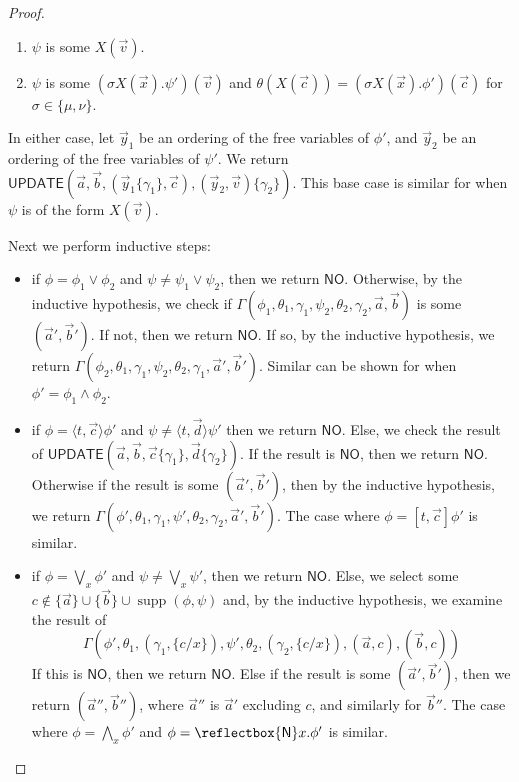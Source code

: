 \documentclass[10pt,a4paper]{article}
\theoremstyle{definition}
\theoremstyle{remark}
\newcommand\new[0]{\reflectbox{\ensuremath{\mathsf{N}}}}
\newcommand\fresh[1]{\new #1.}
\DeclareMathOperator{\supp}{supp}
\newcommand\diam[1]{\langle#1\rangle}
\newcommand\sq[1]{[#1]}
\newcommand\NO[0]{\mathsf{NO}}
\newcommand\update[0]{\mathsf{UPDATE}}
\begin{document}
\begin{proof}
\begin{itemize}
		\begin{enumerate}
			\item $\psi$ is some $X(\vec v)$.
						\item $\psi$ is some $(\sigma X(\vec x).\psi')(\vec v)$ and $\theta(X(\vec c)) = (\sigma X(\vec x).\phi')(\vec c)$ for $\sigma \in \{\mu, \nu\}$.
		\end{enumerate}
		In either case, 
		let $\vec y_1$ be an ordering of the free variables of $\phi'$, and $\vec y_2$ be an ordering of the free variables of $\psi'$. 
		We return $\update(\vec a, \vec b, (\vec y_1\{\gamma_1\}, \vec c), (\vec y_2, \vec v)\{\gamma_2\})$.
		This base case is similar for when $\psi$ is of the form $X(\vec v)$.
	\end{itemize}
	Next we perform inductive steps:
	\begin{itemize}
		\item if $\phi = \phi_1 \lor \phi_2$ and $\psi \neq \psi_1 \lor \psi_2$, then we return $\NO$. 
		Otherwise, by the inductive hypothesis, we check if $\Gamma(\phi_1, \theta_1, \gamma_1, \psi_2, \theta_2, \gamma_2, \vec a, \vec b)$ is some $(\vec a', \vec b')$. 
		If not, then we return $\NO$.
		If so, by the inductive hypothesis, we return $\Gamma(\phi_2, \theta_1, \gamma_1,\psi_2, \theta_2, \gamma_1, \vec a', \vec b')$.
		Similar can be shown for when $\phi' = \phi_1 \land \phi_2$.
				\item if $\phi = \diam{t, \vec c}\phi'$ and $\psi\neq \diam{t, \vec d}\psi'$ then we return $\NO$. 
		Else, we check the result of $\update(\vec a, \vec b, \vec c\{\gamma_1\}, \vec d\{\gamma_2\})$.
		If the result is $\NO$, then we return $\NO$. 
		Otherwise if the result is some $(\vec a', \vec b')$, then by the inductive hypothesis, we return $ \Gamma(\phi', \theta_1, \gamma_1, \psi', \theta_2,\gamma_2, \vec a', \vec b')$.
		The case where $\phi = \sq{t, \vec c}\phi'$ is similar.
				\item if $\phi = \bigvee_x \phi'$ and $\psi \neq \bigvee_x \psi'$, then we return $\NO$. 
		Else, we select some $c \notin \{\vec a\} \cup \{\vec b\} \cup \supp(\phi, \psi)$ and, by the inductive hypothesis,
		we examine the result of $$\Gamma(\phi', \theta_1, (\gamma_1, \{c/x\}), \psi', \theta_2, (\gamma_2, \{c/x\}), (\vec a, c), (\vec b, c))$$
		If this is $\NO$, then we return $\NO$. 
		Else if the result is some $(\vec a', \vec b')$, then we return $(\vec a'', \vec b'')$, where $\vec a''$ is $\vec a'$ excluding $c$, and similarly for $\vec b''$.
		The case where $\phi = \bigwedge_x \phi'$ and $\phi = \fresh{x}\phi'$ is similar.

\end{itemize}
\end{proof}
\end{document}
